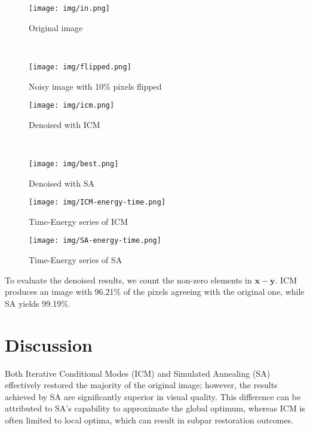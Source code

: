 \documentclass[conference]{IEEEtran}
\begin{document}
\begin{figure}[ht]
\centering
	\begin{minipage}[b]{.7\linewidth}
		\centering
		\texttt{[image: img/in.png]}
		\caption{Original image}
		\label{fig:original}
	\end{minipage}\\
	\begin{minipage}[b]{.7\linewidth}
		\centering
		\texttt{[image: img/flipped.png]}
		\caption{Noisy image with 10\% pixels flipped}
		\label{fig:noisy}
	\end{minipage}
\end{figure}
\begin{figure}[ht]
	\centering
	\begin{minipage}[b]{0.7\linewidth}
		\centering
		\texttt{[image: img/icm.png]}
		\caption{Denoised with ICM}
		\label{fig:icm}
	\end{minipage}\\
	\begin{minipage}[b]{0.7\linewidth}
		\centering
		\texttt{[image: img/best.png]}
		\caption{Denoised with SA}
		\label{fig:sa}
	\end{minipage}
\end{figure}

\begin{figure}[ht]
\centering
\texttt{[image: img/ICM-energy-time.png]}
\caption{Time-Energy series of ICM}
\end{figure}

\begin{figure}[ht]
\centering
\texttt{[image: img/SA-energy-time.png]}
\caption{Time-Energy series of SA}
\end{figure}
To evaluate the denoised results, we count the non-zero elements in $\mathbf{x} - \mathbf{y}$. ICM produces an image with  96.21\% of the pixels agreeing with the original one, while SA yields 99.19\%.

\section{Discussion}

Both Iterative Conditional Modes (ICM) and Simulated Annealing (SA) effectively restored the majority of the original image; however, the results achieved by SA are significantly superior in visual quality. This difference can be attributed to SA's capability to approximate the global optimum, whereas ICM is often limited to local optima, which can result in subpar restoration outcomes.
\end{document}
